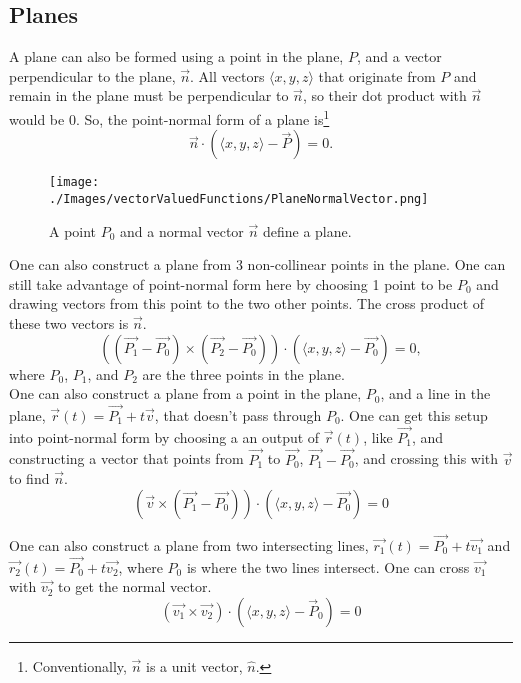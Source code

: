 \subsection{Planes}
\noindent
A plane can also be formed using a point in the plane, $P$, and a vector perpendicular to the plane, $\vec{n}$.
All vectors $\langle x,y,z \rangle$ that originate from $P$ and remain in the plane must be perpendicular to $\vec{n}$, so their dot product with $\vec{n}$ would be 0.
So, the point-normal form of a plane is\footnote{Conventionally, $\vec{n}$ is a unit vector, $\hat{n}$.}
\begin{equation*}
	\vec{n}\cdot\left(\langle x,y,z \rangle - \vec{P}\right) = 0.
\end{equation*}

\begin{figure}[H]
	\centering
	\texttt{[image: ./Images/vectorValuedFunctions/PlaneNormalVector.png]}
	\caption{A point $P_0$ and a normal vector $\vec{n}$ define a plane.}
\end{figure}

\noindent
One can also construct a plane from 3 non-collinear points in the plane.
One can still take advantage of point-normal form here by choosing 1 point to be $P_0$ and drawing vectors from this point to the two other points.
The cross product of these two vectors is $\vec{n}$.
\begin{equation*}
	\left(\left(\vec{P_1} - \vec{P_0}\right) \times \left(\vec{P_2} - \vec{P_0}\right)\right) \cdot \left(\langle x,y,z \rangle - \vec{P_0}\right) = 0,
\end{equation*}
where $P_0$, $P_1$, and $P_2$ are the three points in the plane.\\

\noindent
One can also construct a plane from a point in the plane, $P_0$, and a line in the plane, $\vec{r}(t) = \vec{P_1} + t\vec{v}$, that doesn't pass through $P_0$.
One can get this setup into point-normal form by choosing a an output of $\vec{r}(t)$, like $\vec{P_1}$, and constructing a vector that points from $\vec{P_1}$ to $\vec{P_0}$, $\vec{P_1}-\vec{P_0}$, and crossing this with $\vec{v}$ to find $\vec{n}$.
\begin{equation*}
	\left(\vec{v} \times \left(\vec{P_1} - \vec{P_0}\right)\right) \cdot \left(\langle x,y,z \rangle - \vec{P_0}\right) = 0	
\end{equation*}

\noindent
One can also construct a plane from two intersecting lines, $\vec{r_1}(t) = \vec{P_0} + t\vec{v_1}$ and $\vec{r_2}(t) = \vec{P_0} + t\vec{v_2}$, where $P_0$ is where the two lines intersect.
One can cross $\vec{v_1}$ with $\vec{v_2}$ to get the normal vector.
\begin{equation*}
	\left(\vec{v_1} \times \vec{v_2}\right) \cdot \left(\langle x,y,z \rangle - \vec{P}_{0}\right) = 0
\end{equation*}